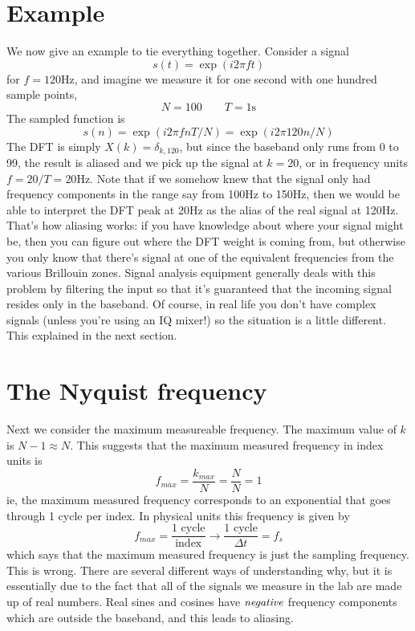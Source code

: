 \documentclass[twocolumn]{article}
\begin{document}
\section{Example}

We now give an example to tie everything together. Consider a signal
\begin{displaymath}
s(t) = \exp (i 2\pi f t)
\end{displaymath}
for $f=120\textrm{Hz}$, and imagine we measure it for one second with one hundred sample points,
\begin{displaymath}
N=100 \qquad T=1\mathrm{s}
\end{displaymath}
The sampled function is
\begin{displaymath}
s(n) = \exp(i2\pi fnT/N) = \exp(i2\pi 120n/N)
\end{displaymath}
The DFT is simply $X(k)=\delta_{k,120}$, but since the baseband only runs from 0 to 99, the result is aliased and we pick up the signal at $k=20$, or in frequency units $f=20/T=20\mathrm{Hz}$. Note that if we somehow knew that the signal only had frequency components in the range say from 100Hz to 150Hz, then we would be able to interpret the DFT peak at 20Hz as the alias of the real signal at 120Hz. That's how aliasing works: if you have knowledge about where your signal might be, then you can figure out where the DFT weight is coming from, but otherwise you only know that there's signal at one of the equivalent frequencies from the various Brillouin zones. Signal analysis equipment generally deals with this problem by filtering the input so that it's guaranteed that the incoming signal resides only in the baseband. Of course, in real life you don't have complex signals (unless you're using an IQ mixer!) so the situation is a little different. This explained in the next section.

\section{The Nyquist frequency}

Next we consider the maximum measureable frequency. The maximum value of $k$ is $N-1\approx N$. This suggests that the maximum measured frequency in index units is
\begin{displaymath}
f_{max}=\frac{k_{max}}{N}=\frac{N}{N}=1
\end{displaymath}
ie, the maximum measured frequency corresponds to an exponential that goes through 1 cycle per index. In physical units this frequency is given by
\begin{displaymath}
f_{max}=\frac{\text{1 cycle}}{\text{index}}\rightarrow\frac{\text{1 cycle}}{\Delta t}=f_{s}
\end{displaymath}
which says that the maximum measured frequency is just the sampling frequency. This is wrong. There are several different ways of understanding why, but it is essentially due to the fact that all of the signals we measure in the lab are made up of real numbers. Real sines and cosines have $\emph{negative}$ frequency components which are outside the baseband, and this leads to aliasing.
\end{document}
